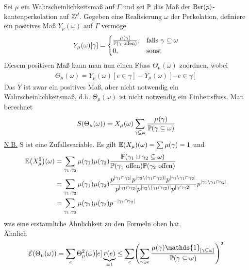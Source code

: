 Sei $\mu$ ein Wahrscheinlichkeitsmaß auf $\Gamma$ und sei $\mathbb{P}$ das Maß der $\operatorname{Ber}(p)$-kantenperkolation auf $\mathbb{Z}^d$. Gegeben eine Realisierung $\omega$ der Perkolation, definiere ein positives Maß $Y_{\mu}(\omega)$ auf $\Gamma$ vermöge
\begin{gather}
	Y_{\mu}(\omega)[\gamma] = \begin{cases}
								\frac{\mu(\gamma)}{\propE{\gamma \text{ offen}}}, & \text{falls } \gamma \subseteq \omega \\
								0, & \text{sonst}
						\end{cases}		
\end{gather} 
Diesem positiven Maß kann man nun einen Fluss $\Theta_{\mu} (\omega)$ zuordnen, wobei 
\begin{align}
	\Theta_{\mu}(\omega) = Y_{\mu}(\omega)[e \in \gamma] - Y_{\mu}(\omega)[-e \in \gamma]
\end{align}
Das $Y$ ist zwar ein positives Maß, aber nicht notwendig ein Wahrscheinlichkeitsmaß, d.h. $\Theta_{\mu}(\omega)$ ist nicht notwendig ein Einheitsfluss. Man berechnet 
\begin{align}
	S (\Theta_{\mu}(\omega)) = X_{\mu}(\omega) \sum\limits_{\gamma \subseteq \omega} \frac{\mu(\gamma)}{\propE{\gamma \subseteq \omega}} 
\end{align}
\underline{N.B.} S ist eine Zufallsvariable. Es gilt $\EW{X_{\mu}}(\omega) = \sum \mu(\gamma) = 1$ und
\begin{align}
\EW{X^2_{\mu}}(\omega) &= \sum\limits_{\gamma_1,\gamma_2}\mu(\gamma_1) \mu(\gamma_2) \frac{\prop{\gamma_1 \cup \gamma_2 \subseteq \omega}}{\prop{\gamma_1 \text{ offen}} \prop{\gamma_2 \text{ offen}}} \\
	&= \sum\limits_{\gamma_1,\gamma_2} \mu(\gamma_1)\mu(\gamma_2) \frac{p^{\abs{\gamma_1 \cap \gamma_2}} p^{\abs{\gamma_2 \backslash \enb{\gamma_1 \cap \gamma_2}}} p^{\abs{\gamma_1 \backslash \gamma_1 \cap \gamma_2}} } {p^{\abs{\gamma_1 \cap \gamma_2}} p^{\abs{\gamma_2 \backslash \enb{\gamma_1 \cap \gamma_2}}} p^{\abs{\gamma \cap \gamma 2}}} {p^{\abs{\gamma_1 \backslash \gamma_1 \cap \gamma_2}}} \\ 
	&= \sum\limits_{\gamma_1, \gamma_2} \mu(\gamma_1)\mu(\gamma_2) p^{-\abs{\gamma_1 \cap \gamma_2}}
\end{align}
was eine erstaunliche Ähnlichkeit zu den Formeln oben hat. \\
Ähnlich
\begin{align}
	\mathcal{E}\enb{\Theta_{\mu}(\omega)} = \sum\limits_{e} \Theta^2_{\mu} (\omega)[e] \underbrace{r(e)}_{=1} \leq \sum\limits_{e}\enb{ \sum\limits_{\gamma \ni e} \frac{\mu(\gamma) \mathds{1}_{[\gamma \subseteq \omega]}}{\propE{\gamma \subseteq \omega}}}^2
\end{align}		
